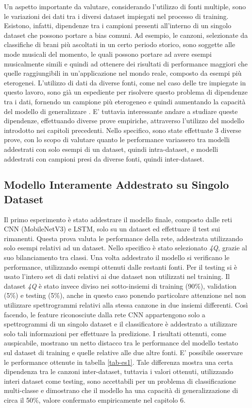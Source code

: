 \documentclass[11pt]{report}
\begin{document}
Un aspetto importante da valutare, considerando l'utilizzo di fonti multiple, sono le variazioni dei dati tra i diversi dataset impiegati nel processo di training. Esistono, infatti, dipendenze tra i campioni presenti all'interno di un singolo dataset che possono portare a bias comuni. Ad esempio, le canzoni, selezionate da classifiche di brani più ascoltati in un certo periodo storico, sono soggette alle mode musicali del momento, le quali possono portare ad avere esempi musicalmente simili e quindi ad ottenere dei risultati di performance maggiori che quelle raggiungibili in un'applicazione nel mondo reale, composto da esempi più eterogenei. L'utilizzo di dati da diverse fonti, come nel caso delle tre impiegate in questo lavoro, sono già un espediente per risolvere questo problema di dipendenze tra i dati, fornendo un campione più eterogeneo e quindi aumentando la capacità del modello di generalizzare \cite{intra-inter}. E' tuttavia interessante andare a studiare queste dipendenze, effettuando diverse prove empiriche, attraverso l'utilizzo del modello introdotto nei capitoli precedenti. Nello specifico, sono state effettuate 3 diverse prove, con lo scopo di valutare quanto le performance variassero tra modelli addestrati con solo esempi di un dataset, quindi intra-dataset, e modelli addestrati con campioni presi da diverse fonti, quindi inter-dataset.

\subsection{Modello Interamente Addestrato su Singolo Dataset}

Il primo esperimento è stato addestrare il modello finale, composto dalle reti CNN (MobileNetV3) e LSTM, solo su un dataset ed effettuare il test sui rimanenti. Questa prova valuta le performance della rete, addestrata utilizzando solo esempi relativi ad un dataset. Nello specifico è stato selezionato \textit{4Q}, grazie al suo bilanciamento tra classi. Una volta addestrato il modello si verificano le performance, utilizzando esempi ottenuti dalle restanti fonti. Per il testing si è usato l'intero set di dati relativi ai due dataset non utilizzati nel training. Il dataset \textit{4Q} è stato invece diviso nei sotto-insiemi di training (90\%), validation (5\%) e testing (5\%), anche in questo caso ponendo particolare attenzione nel non utilizzare spettrogrammi relativi alla stessa canzone in due insiemi differenti. Così facendo, le feature riconosciute dalla rete CNN appartengono solo a spettrogrammi di un singolo dataset e il classificatore è addestrato a utilizzare solo tali informazioni per effettuare la predizione. I risultati ottenuti, come auspicabile, mostrano un netto distacco tra le performance del modello testato sul dataset di training e quelle relative alle due altre fonti. E' possibile osservare le performance ottenute in tabella \ref{tab-es1}. Tale differenza mostra una certa dipendenza tra le canzoni  inter-dataset, tuttavia i valori ottenuti, utilizzando interi dataset come testing, sono accettabili per un problema di classificazione multi-classe e dimostrano che il modello ha una capacità di generalizzazione di circa il 50\%, valore confermato empiricamente nel capitolo 6.
\end{document}
